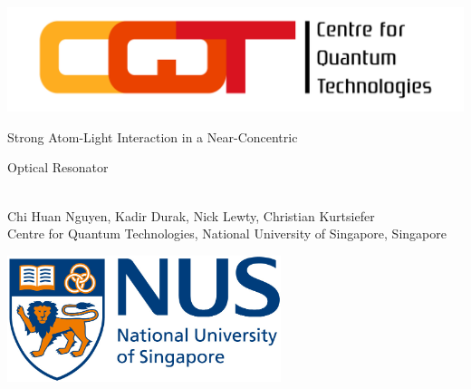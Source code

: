 \documentclass[portrait,a0,final]{a0poster} %
\newenvironment{poster}{
  \begin{center}
  \begin{minipage}[c]{0.98\textwidth}
}{
  \end{minipage} 
  \end{center}
}
\begin{document}

\begin{poster}
\large \sf
\vspace{2cm}
\begin{center}

      \begin{minipage}[c]{0.05\textwidth}
        \begin{center}
          \includegraphics[width=14cm,angle=0]{CQT_Logo_CMYK.jpg}
        \end{center}
      \end{minipage}\hspace{10cm}
      \begin{minipage}[c]{0.7\textwidth}
        \begin{center}
          {\sc \huge Strong Atom-Light Interaction in a Near-Concentric \\ \vspace{0.8cm}
          
Optical Resonator}\\[9mm]
          {\large Chi Huan Nguyen, Kadir Durak, Nick Lewty, Christian Kurtsiefer}\\[9mm]
          Centre for Quantum Technologies, National University of Singapore, Singapore\\
          
        \end{center}
      \end{minipage}
      \begin{minipage}[l]{0.1\textwidth}
        \begin{center}
          \includegraphics[width=8cm,angle=0]{NUS_logo_full-horizontal.jpg}
        \end{center}
      \end{minipage}
\end{center}


\end{poster}
\end{document}
